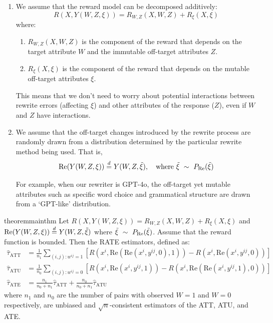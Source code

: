 \documentclass{article}
\begin{document}
\begin{enumerate}
  \item We assume that the reward model can be decomposed additively: 
    \[R(X, Y(W, Z, \xi)) = R_{W, Z}(X, W, Z) + R_{\xi}(X, \xi)\]
  where:
  \begin{enumerate}
    \item $R_{W,Z}(X, W, Z)$ is the component of the reward that depends on the target attribute $W$ and the immutable off-target attributes $Z$.
    \item $R_{\xi}(X, \xi)$ is the component of the reward that depends on the mutable off-target attributes $\xi$.
  \end{enumerate}
  This means that we don't need to worry about potential interactions between rewrite errors (affecting $\xi$) and other attributes of the response ($Z$), even if $W$ and $Z$ have interactions.

  \item We assume that the off-target changes introduced by the rewrite process are randomly drawn from a distribution determined by the particular rewrite method being used. That is,
    \[\text{Re}(Y(W, Z, \xi)) \overset{d}{=} Y(W, Z, \tilde{\xi}), \quad \text{where } \tilde{\xi} \ \sim\  P_\text{Re}(\tilde{\xi})\]

  For example, when our rewriter is GPT-4o, the off-target yet mutable attributes such as specific word choice and grammatical structure are drawn from a `GPT-like' distribution.
\end{enumerate}

\begin{restatable}{theorem}{mainthm}
\label{thm:mainthm}
  Let $R(X, Y(W,Z,\xi)) = R_{W, Z}(X, W, Z) + R_{\xi}(X, \xi)$ and $\text{Re}(Y(W, Z, \xi)) \overset{d}{=} Y(W, Z, \tilde{\xi})$ where $\tilde{\xi} \ \sim\  P_\text{Re}(\tilde{\xi})$. Assume that the reward function is bounded.
  Then the RATE estimators, defined as:
  \begin{align*}
  \hat{\tau}_{\text{ATT}} &= \frac{1}{n_1} \sum_{(i, j): w^{ij} = 1} [R(x^i, \text{Re}(\text{Re}(x^i, y^{ij}, 0), 1)) - R(x^i, \text{Re}(x^i, y^{ij}, 0))] \\
  \hat{\tau}_{\text{ATU}} &= \frac{1}{n_0} \sum_{(i,j): w^{ij} = 0} [R(x^i, \text{Re}(x^i, y^{ij}, 1)) - R(x^i, \text{Re}(\text{Re}(x^i, y^{ij}, 1), 0))] \\
  \hat{\tau}_{\text{ATE}} &= \frac{n_1}{n_0 + n_1} \hat{\tau}_{\text{ATT}} + \frac{n_0}{n_0 + n_1} \hat{\tau}_{\text{ATU}}
\end{align*}
where $n_1$ and $n_0$ are the number of pairs with observed $W = 1$ and $W = 0$ respectively, are unbiased and $\sqrt{n}$-consistent estimators of the ATT, ATU, and ATE.
\end{restatable}
\end{document}
